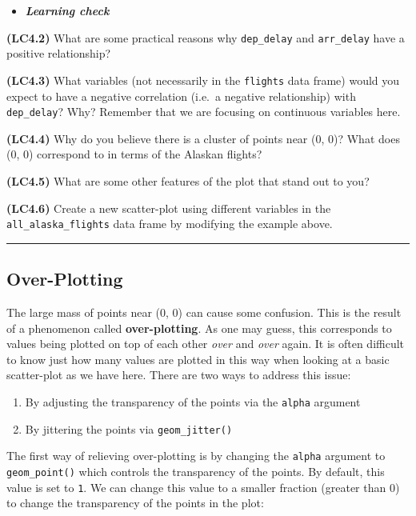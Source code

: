 \documentclass[]{tufte-book}
\let\oldrule=\rule
\renewcommand{\rule}[1]{\oldrule{\linewidth}}
\providecommand{\tightlist}{%
  \setlength{\itemsep}{0pt}\setlength{\parskip}{0pt}}
\newenvironment{rmdblock}[1]
  {\begin{shaded*}
  \begin{itemize}
  \renewcommand{\labelitemi}{
    \raisebox{-.7\height}[0pt][0pt]{
    }
  }
  \item
  }
  {
  \end{itemize}
  \end{shaded*}
  }
\newenvironment{learncheck}
  {\begin{rmdblock}{warning}}
  {\end{rmdblock}}
\begin{document}
\begin{learncheck}
\textbf{\emph{Learning check}}
\end{learncheck}

\textbf{(LC4.2)} What are some practical reasons why \texttt{dep\_delay}
and \texttt{arr\_delay} have a positive relationship?

\textbf{(LC4.3)} What variables (not necessarily in the \texttt{flights}
data frame) would you expect to have a negative correlation (i.e.~a
negative relationship) with \texttt{dep\_delay}? Why? Remember that we
are focusing on continuous variables here.

\textbf{(LC4.4)} Why do you believe there is a cluster of points near
(0, 0)? What does (0, 0) correspond to in terms of the Alaskan flights?

\textbf{(LC4.5)} What are some other features of the plot that stand out
to you?

\textbf{(LC4.6)} Create a new scatter-plot using different variables in
the \texttt{all\_alaska\_flights} data frame by modifying the example
above.

\begin{center}\rule{0.5\linewidth}{\linethickness}\end{center}

\subsection{Over-Plotting}\label{over-plotting}

The large mass of points near (0, 0) can cause some confusion. This is
the result of a phenomenon called \textbf{over-plotting}. As one may
guess, this corresponds to values being plotted on top of each other
\emph{over} and \emph{over} again. It is often difficult to know just
how many values are plotted in this way when looking at a basic
scatter-plot as we have here. There are two ways to address this issue:

\begin{enumerate}
\def\labelenumi{\arabic{enumi}.}
\tightlist
\item
  By adjusting the transparency of the points via the \texttt{alpha}
  argument
\item
  By jittering the points via \texttt{geom\_jitter()}
\end{enumerate}

The first way of relieving over-plotting is by changing the
\texttt{alpha} argument to \texttt{geom\_point()} which controls the
transparency of the points. By default, this value is set to \texttt{1}.
We can change this value to a smaller fraction (greater than 0) to
change the transparency of the points in the plot:
\end{document}
